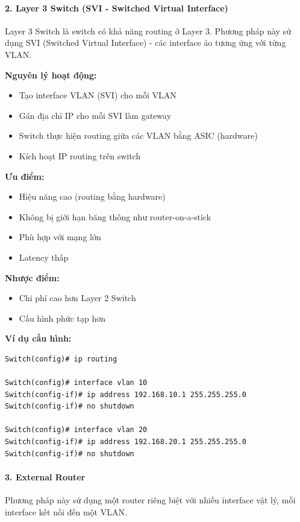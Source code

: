 \paragraph{2. Layer 3 Switch (SVI - Switched Virtual Interface)}
Layer 3 Switch là switch có khả năng routing ở Layer 3. Phương pháp này sử dụng SVI (Switched Virtual Interface) - các interface ảo tương ứng với từng VLAN.

\textbf{Nguyên lý hoạt động:}
\begin{itemize}
    \item Tạo interface VLAN (SVI) cho mỗi VLAN
    \item Gán địa chỉ IP cho mỗi SVI làm gateway
    \item Switch thực hiện routing giữa các VLAN bằng ASIC (hardware)
    \item Kích hoạt IP routing trên switch
\end{itemize}

\textbf{Ưu điểm:}
\begin{itemize}
    \item Hiệu năng cao (routing bằng hardware)
    \item Không bị giới hạn băng thông như router-on-a-stick
    \item Phù hợp với mạng lớn
    \item Latency thấp
\end{itemize}

\textbf{Nhược điểm:}
\begin{itemize}
    \item Chi phí cao hơn Layer 2 Switch
    \item Cấu hình phức tạp hơn
\end{itemize}

\textbf{Ví dụ cấu hình:}
\begin{verbatim}
Switch(config)# ip routing

Switch(config)# interface vlan 10
Switch(config-if)# ip address 192.168.10.1 255.255.255.0
Switch(config-if)# no shutdown

Switch(config)# interface vlan 20
Switch(config-if)# ip address 192.168.20.1 255.255.255.0
Switch(config-if)# no shutdown
\end{verbatim}

\paragraph{3. External Router}
Phương pháp này sử dụng một router riêng biệt với nhiều interface vật lý, mỗi interface kết nối đến một VLAN.

